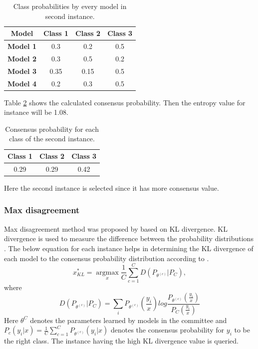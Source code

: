 \begin{table}[h!]
	\centering
	\begin{tabular}{|c|c|c|c|}
		\hline
		\textbf{Model}   & \textbf{Class 1} & \textbf{Class 2} & \textbf{Class 3} \\ \hline
		\textbf{Model 1} & 0.3              & 0.2              & 0.5              \\ \hline
		\textbf{Model 2} & 0.3              & 0.5              & 0.2              \\ \hline
		\textbf{Model 3} & 0.35             & 0.15             & 0.5              \\ \hline
		\textbf{Model 4} & 0.2              & 0.3              & 0.5              \\ \hline
	\end{tabular}
	\caption{Class probabilities by every model in second instance.}
	\label{con3}
\end{table}
Table \ref{con4} shows the calculated consensus probability. Then the entropy value for instance will be 1.08.
\begin{table}[h!]
	\centering
	\begin{tabular}{|c|c|c|}
		\hline
		\textbf{Class 1} & \textbf{Class 2} & \textbf{Class 3} \\ \hline
		0.29             & 0.29             & 0.42             \\ \hline
	\end{tabular}
	\caption{Consensus probability for each class of the second instance.}
	\label{con4}
\end{table} 
Here the second instance is selected since it has more consensus value.	\cite{Settles2010}

\subsubsection{Max disagreement}
Max disagreement method was proposed by \cite{mccallumzy1998employing} based on KL divergence. KL divergence is used to measure the difference between the probability distributions \cite{kullback1951information}. The below equation for each instance helps in determining the KL divergence of each model to the consensus probability distribution according to \cite{kullback1951information}. 
\begin{equation} 
x^*_{KL} = \operatorname*{argmax}_x \frac{1}{C} \sum_{c=1}^{C} D (P_{\theta^(c)}|P_C), 
\end{equation} where 
\begin{equation}  D(P_{\theta^(c)}|P_C) = \sum_{i} P_{\theta^(c)}(\frac{y_i}{x}) log \frac{P_{\theta^(c)}(\frac{y_i}{x})}{P_{C}(\frac{y_i}{x})}  
\end{equation} 
Here $\theta^C$ denotes the parameters learned by models in the committee and  $P_c(y_i|x) = \frac{1}{C} \sum_{c=1}^{C} P_{\theta^(c)}(y_i|x)$ denotes the consensus probability for $y_i$ to be the right class. The instance having the high KL divergence value is queried. \cite{Settles2010}

